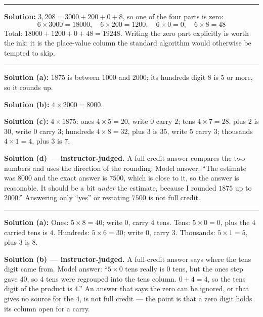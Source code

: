 \documentclass[12pt]{article}
\begin{document}
\vspace{0.12cm}\noindent\rule{\linewidth}{0.2pt}


\textbf{Solution:} $3{,}208 = 3000 + 200 + 0 + 8$, so one of the four parts is zero:
\[ 6 \times 3000 = \boxed{18000}, \quad 6 \times 200 = \boxed{1200}, \quad
   6 \times 0 = \boxed{0}, \quad 6 \times 8 = \boxed{48} \]
Total: $18000 + 1200 + 0 + 48 = 19248$. Writing the zero part explicitly is worth the ink: it is the
place-value column the standard algorithm would otherwise be tempted to skip. 

\vspace{0.12cm}\noindent\rule{\linewidth}{0.2pt}


\textbf{Solution (a):} $1875$ is between $1000$ and $2000$; its hundreds digit $8$ is $5$ or more, so
it rounds up. 

\textbf{Solution (b):} $4 \times 2000 = 8000$. 

\textbf{Solution (c):} $4 \times 1875$: ones $4 \times 5 = 20$, write $0$ carry $2$; tens
$4 \times 7 = 28$, plus $2$ is $30$, write $0$ carry $3$; hundreds $4 \times 8 = 32$, plus $3$ is
$35$, write $5$ carry $3$; thousands $4 \times 1 = 4$, plus $3$ is $7$. 

\textbf{Solution (d) --- instructor-judged.} A full-credit answer compares the two numbers and uses the
direction of the rounding. Model answer: ``The estimate was $8000$ and the exact answer is $7500$,
which is close to it, so the answer is reasonable. It should be a bit \emph{under} the estimate,
because I rounded $1875$ up to $2000$.'' Answering only ``yes'' or restating $7500$ is not full credit.

\vspace{0.12cm}\noindent\rule{\linewidth}{0.2pt}


\textbf{Solution (a):} Ones: $5 \times 8 = 40$; write $0$, carry $4$ tens. Tens: $5 \times 0 = 0$,
plus the $4$ carried tens is $4$. Hundreds: $5 \times 6 = 30$; write $0$, carry $3$. Thousands:
$5 \times 1 = 5$, plus $3$ is $8$. 

\textbf{Solution (b) --- instructor-judged.} A full-credit answer says where the tens digit came from.
Model answer: ``$5 \times 0$ tens really is $0$ tens, but the ones step gave $40$, so $4$ tens were
regrouped into the tens column. $0 + 4 = 4$, so the tens digit of the product is $4$.'' An answer
that says the zero can be ignored, or that gives no source for the $4$, is not full credit --- the
point is that a zero digit holds its column open for a carry.
\end{document}
